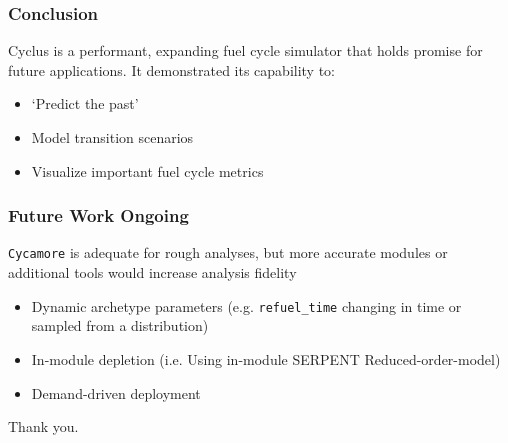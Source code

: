 \begin{frame}
    \frametitle{Conclusion}
    Cyclus is a performant, expanding fuel cycle simulator that holds promise for future applications. It demonstrated its capability to:
    \begin{itemize}
        \item `Predict the past'
        \item Model transition scenarios
        \item Visualize important fuel cycle metrics
    \end{itemize}
\end{frame}

\begin{frame}
    \frametitle{Future Work Ongoing}
    \texttt{Cycamore} is adequate for rough analyses, but more accurate
    modules or additional tools would increase analysis fidelity
    \begin{itemize}
        \item Dynamic archetype parameters (e.g. \texttt{refuel\_time}
                changing in time or sampled from a distribution)
        \item In-module depletion (i.e. Using in-module SERPENT Reduced-order-model)
        \item Demand-driven deployment \footnotemark
    \end{itemize}
\end{frame}


\begin{frame}
    Thank you.
\end{frame}